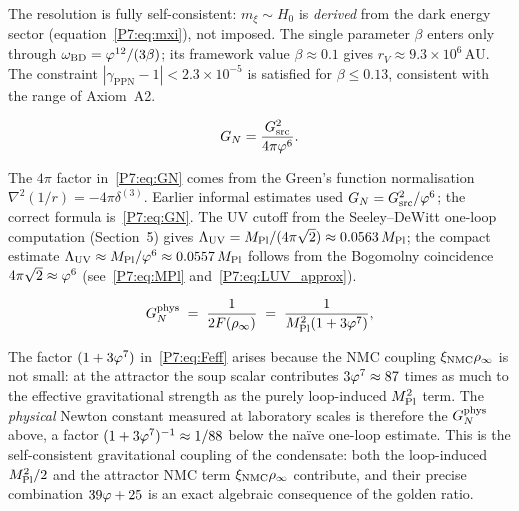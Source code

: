 \begin{remark}
\label{P7:rem:cassini_self}
The resolution is fully self-consistent: $m_\xi\sim H_0$ is \emph{derived}
from the dark energy sector (equation~\eqref{P7:eq:mxi}), not imposed.
The single parameter $\beta$ enters only through $\omega_{\mathrm{BD}} = \varphi^{12}/(3\beta)$;
its framework value $\beta\approx0.1$ gives $r_V\approx9.3\times10^6\,\mathrm{AU}$.
The constraint $|\gamma_{\mathrm{PPN}}-1|<2.3\times10^{-5}$ is satisfied
for $\beta\leq0.13$, consistent with the range of Axiom~A2.
\end{remark}

\begin{equation}
  G_N = \frac{G_{\mathrm{src}}^2}{4\pi\varphi^6}.
  \label{P7:eq:GN}
\end{equation}

\begin{remark}
\label{P7:rem:4pi_factor}
The $4\pi$ factor in~\eqref{P7:eq:GN} comes from the Green's function
normalisation $\nabla^2(1/r)=-4\pi\delta^{(3)}$.
Earlier informal estimates used $G_N=G_{\mathrm{src}}^2/\varphi^6$; the
correct formula is~\eqref{P7:eq:GN}.
The UV cutoff from the Seeley--DeWitt one-loop computation (Section~5)
gives $\Lambda_{\mathrm{UV}} = M_{\mathrm{Pl}}/(4\pi\sqrt{2})\approx0.0563\,M_{\mathrm{Pl}}$;
the compact estimate $\Lambda_{\mathrm{UV}}\approx M_{\mathrm{Pl}}/\varphi^6\approx0.0557\,M_{\mathrm{Pl}}$
follows from the Bogomolny coincidence $4\pi\sqrt{2}\approx\varphi^6$
(see~\eqref{P7:eq:MPl} and~\eqref{P7:eq:LUV_approx}).
\end{remark}

\begin{equation}
  G_N^{\rm phys}
  \;=\; \frac{1}{2F(\rho_{\infty})}
  \;=\; \frac{1}{M_{\mathrm{Pl}}^2(1+3\varphi^7)},
  \label{P7:eq:GN_phys}
\end{equation}

\begin{remark}
\label{P7:rem:MPl_renorm}
The factor $(1+3\varphi^7)$ in~\eqref{P7:eq:Feff} arises because the NMC coupling
$\xi_{\mathrm{NMC}}\rho_\infty$ is not small: at the attractor the soup scalar contributes
$3\varphi^7\approx87$ times as much to the effective gravitational strength as the
purely loop-induced $M_{\mathrm{Pl}}^2$ term.
The \emph{physical} Newton constant measured at laboratory scales is
therefore the $G_N^{\rm phys}$ above, a factor $(1+3\varphi^7)^{-1}\approx1/88$
below the na\"ive one-loop estimate.
This is the self-consistent gravitational coupling of the condensate: both the
loop-induced $M_{\mathrm{Pl}}^2/2$ and the attractor NMC term $\xi_{\mathrm{NMC}}\rho_{\infty}$ contribute,
and their precise combination $39\varphi+25$ is an exact algebraic consequence of
the golden ratio.
\end{remark}

